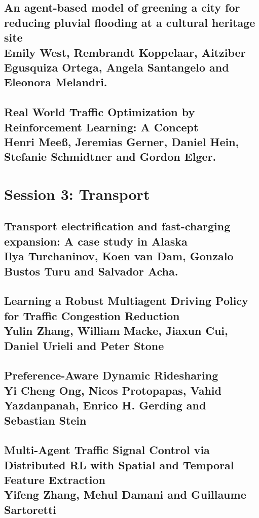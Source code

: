\documentclass[a4paper,11pt]{article}
\begin{document}
 \subsection{An agent-based model of greening a city for reducing pluvial flooding at a cultural heritage site \\ Emily West, Rembrandt Koppelaar, Aitziber Egusquiza Ortega, Angela Santangelo and Eleonora Melandri.}
 
 
 \subsection{Real World Traffic Optimization by Reinforcement Learning: A Concept \\ Henri Meeß, Jeremias Gerner, Daniel Hein, Stefanie Schmidtner and Gordon Elger. }
 

\section{Session 3: Transport}

\subsection{Transport electrification and fast-charging expansion: A case study in Alaska \\ Ilya Turchaninov, Koen van Dam, Gonzalo Bustos Turu and Salvador Acha.}
 
 
 \subsection{Learning a Robust Multiagent Driving Policy for Traffic Congestion Reduction \\ Yulin Zhang, William Macke, Jiaxun Cui, Daniel Urieli and Peter Stone}
 
 
 \subsection{Preference-Aware Dynamic Ridesharing \\ Yi Cheng Ong, Nicos Protopapas, Vahid Yazdanpanah, Enrico H. Gerding and Sebastian Stein}
 
 
 \subsection{Multi-Agent Traffic Signal Control via Distributed RL with Spatial and Temporal Feature Extraction \\ Yifeng Zhang, Mehul Damani and Guillaume Sartoretti}
 
 
\end{document}
